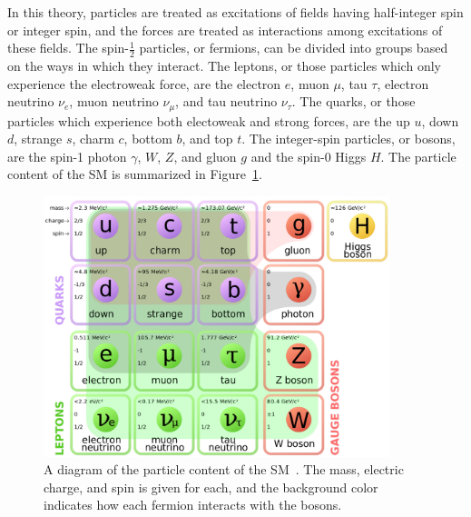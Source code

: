 In this theory, particles are treated as excitations of fields having half-integer spin or
integer spin, and the forces are treated as interactions among excitations of these fields.
The spin-$\frac{1}{2}$ particles, or fermions, can be divided into groups based on the ways
in which they interact. The leptons, or those particles which only experience the electroweak force,
are the electron $e$, muon $\mu$, tau $\tau$, electron neutrino $\nu_e$, muon neutrino $\nu_\mu$, and
tau neutrino $\nu_\tau$. The quarks, or those particles which experience both electoweak and strong
forces, are the up $u$, down $d$, strange $s$, charm $c$, bottom $b$, and top $t$. The integer-spin
particles, or bosons, are the spin-1 photon $\gamma$, $W$, $Z$, and gluon $g$ and the spin-0 Higgs $H$.
The particle content of the SM is summarized in Figure~\ref{fig:SMtable}.

\begin{figure}[ht]
 \begin{center}
    \includegraphics[width=0.90\textwidth]{figures/intro/Standard_Model_of_Elementary_Particles_modified_version.pdf}
      \end{center}
\caption{A diagram of the particle content of the SM~\cite{SMdiagram}.
The mass, electric charge, and spin is given for each, and the background color indicates how each
fermion interacts with the bosons.}
\label{fig:SMtable}
\end{figure}

